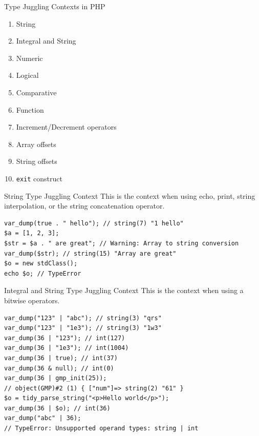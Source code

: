 \documentclass[aspectratio=169]{beamer}
\newcommand{\type}[1]{\texttt{\textbf{#1}}}
\begin{document}
\begin{frame}{Type Juggling Contexts in PHP}
    \begin{enumerate}
        \item String
        \item Integral and String
        \item Numeric
        \item Logical
        \item Comparative
        \item Function
        \item Increment/Decrement operators
        \item Array offsets
        \item String offsets
        \item \texttt{exit} construct
    \end{enumerate}
\end{frame}

\begin{frame}[fragile]{String Type Juggling Context}
    This is the context when using echo, print, string interpolation, or the string concatenation operator.

    \begin{verbatim}
var_dump(true . " hello"); // string(7) "1 hello"
$a = [1, 2, 3];
$str = $a . " are great"; // Warning: Array to string conversion
var_dump($str); // string(15) "Array are great"
$o = new stdClass();
echo $o; // TypeError
    \end{verbatim}
\end{frame}

\begin{frame}[fragile]{Integral and String Type Juggling Context}
    This is the context when using a bitwise operators. 
    \note[item]{\type{null} to 0, \type{false} to 0, \type{true} to 1}
    
    \begin{verbatim}
var_dump("123" | "abc"); // string(3) "qrs"
var_dump("123" | "1e3"); // string(3) "1w3"
var_dump(36 | "123"); // int(127)
var_dump(36 | "1e3"); // int(1004)
var_dump(36 | true); // int(37)
var_dump(36 & null); // int(0)
var_dump(36 | gmp_init(25));
// object(GMP)#2 (1) { ["num"]=> string(2) "61" }
$o = tidy_parse_string("<p>Hello world</p>");
var_dump(36 | $o); // int(36)
var_dump("abc" | 36);
// TypeError: Unsupported operand types: string | int
    \end{verbatim}
\end{frame}
\end{document}
